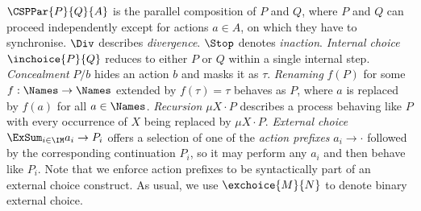 \documentclass[copyright,creativecommons]{eptcs}
\begin{document}
$\CSPPar{P}{Q}{A}$ is the parallel composition of $ P $ and $ Q $, where $ P $ and $ Q $ can proceed independently except for actions $ a \in A $, on which they have to synchronise.
$\Div$ describes \emph{divergence}.
$\Stop$ denotes \emph{inaction}.
\emph{Internal choice} $\inchoice{P}{Q}$ reduces to either $ P $ or $ Q $ within a single internal step.
\emph{Concealment} $P/b$ hides an action $ b $ and masks it as $ \tau $.
\emph{Renaming} $f(P)$ for some $f:\Names \to \Names$ extended by $f(\tau)=\tau$ behaves as $ P $, where $ a $ is replaced by $ f(a) $ for all $ a \in \Names $.
\emph{Recursion} $\mu X \cdot P$ describes a process behaving like $P$ with every occurrence of $X$ being replaced by $\mu X \cdot P$.
\emph{External choice} $\ExSum_{i \in \IM} a_i \rightarrow P_i$ offers a selection of one of the \emph{action prefixes} $a_i \rightarrow \cdot $ followed by the corresponding continuation $P_i$, so it may perform any $ a_i $ and then behave like $P_i$. Note that we enforce action prefixes to be syntactically part of an external choice construct.
 As usual, we use $\exchoice{M}{N}$ to denote binary external choice.
\end{document}
